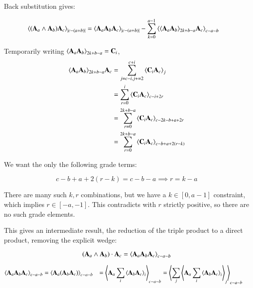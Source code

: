 \documentclass{article}      %
\newcommand{\gpgrade}[2] {{\left\langle{{#1}}\right\rangle}_{#2}}
\begin{document}



Back substitution gives:

\begin{align*}
\gpgrade{ (\BA_a \wedge \BA_b) \BA_c }{\abs{c-(a+b)}} 
&=
\gpgrade{ \BA_a \BA_b \BA_c }{\abs{c-(a+b)}} 
-
\sum_{k=0}^{a-1}
\gpgrade{ \gpgrade{\BA_a\BA_b}{2k + b - a} \BA_c }{c-a-b}
\end{align*}

Temporarily writing $\gpgrade{\BA_a\BA_b}{2k + b - a} = \BC_i$,
\begin{align*}
\gpgrade{\BA_a\BA_b}{2k + b - a} \BA_c
&= \sum_{j=c-i,j+=2}^{c+i} \gpgrade{ \BC_i \BA_c }{j} \\
&= \sum_{r=0}^{i} \gpgrade{ \BC_i \BA_c }{c-i+2r} \\
&= \sum_{r=0}^{2k+b-a} \gpgrade{ \BC_i \BA_c }{c-2k-b+a+2r} \\
&= \sum_{r=0}^{2k+b-a} \gpgrade{ \BC_i \BA_c }{c-b+a +2(r-k)} \\
\end{align*}

We want the only the following grade terms:

\[
c-b+a+2(r-k) = c - b - a
\implies
r=k-a
\]

There are many such $k,r$ combinations, but we have a $k \in [0,a-1]$ constraint, which implies $r \in [-a,-1]$.  This contradicts with $r$ strictly
positive,
so there are no such grade elements.

This gives an intermediate result, the reduction of the triple product to a direct product, removing the explicit wedge:

\begin{equation}
(\BA_a \wedge \BA_b) \cdot \BA_c =
\gpgrade{\BA_a \BA_b \BA_c}{c-a-b}
\end{equation}

\begin{align*}
\gpgrade{\BA_a \BA_b \BA_c}{c-a-b}
&= \gpgrade{\BA_a (\BA_b \BA_c)}{c-a-b}
&= \gpgrade{\BA_a \sum_{i}\gpgrade{\BA_b \BA_c}{i}}{c-a-b}
&= \gpgrade{\sum_{j}\gpgrade{\BA_a \sum_{i}\gpgrade{\BA_b \BA_c}{i}}{j}}{c-a-b}
\end{align*}
\end{document}
